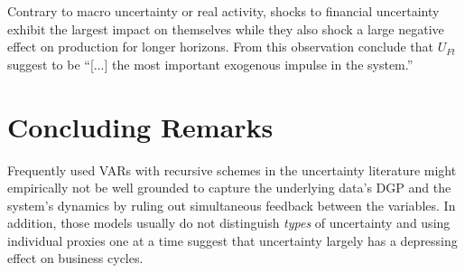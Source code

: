 \documentclass[a4paper,11pt,listof=nochaptergap,oneside,pointednumbers,bibtotoc,bigheadings,liststotoc,hidelinks]{scrbook}
\theoremstyle{mysatz}
\theoremstyle{mydefinition}
\theoremstyle{mytheorem}
\theoremstyle{mybemerkung}
\renewcommand*{\paragraph}[1]{\subsubsection*{#1} \vspace{-3mm}} %
\begin{document}
Contrary to macro uncertainty or real activity, shocks to financial uncertainty exhibit the largest impact on themselves while they also shock a large negative effect on production for longer horizons. From this observation \citet[p. 28]{ludvigsonetal:19} conclude that $U_{Ft}$ suggest to be ``[...] the most important exogenous impulse in the system.''











\chapter{Concluding Remarks}
\label{Conclusion}
Frequently used VARs with recursive schemes in the uncertainty literature might empirically not be well grounded to capture the underlying data's DGP and the system's dynamics by ruling out simultaneous feedback between the variables. In addition, those models usually do not distinguish \textit{types} of uncertainty and using individual proxies one at a time suggest that uncertainty largely has a depressing effect on business cycles.
\end{document}
